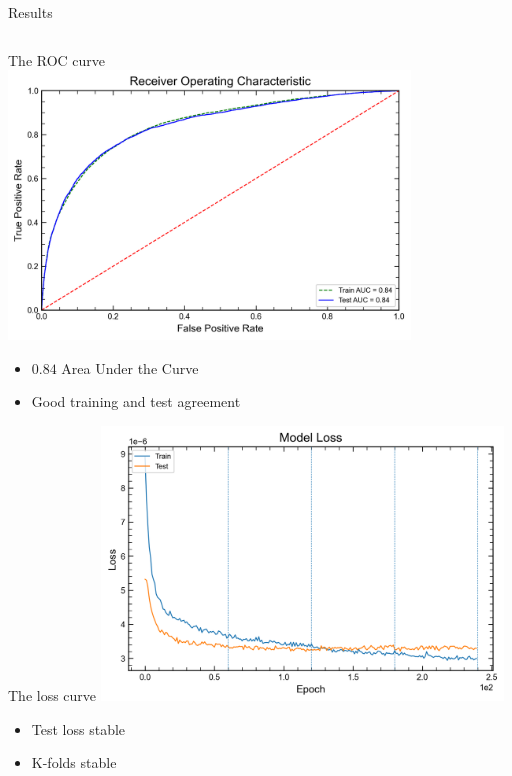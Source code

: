 \begin{frame}{Results}
\begin{columns}
\begin{column}{0.5\textwidth}
        \end{column}
    \end{columns}    
\end{frame}



\begin{frame}{The ROC curve}
  \centering \includegraphics[width=0.8\textwidth]{ROC_binary}
  \begin{itemize}
    \item $0.84$ Area Under the Curve
    \item Good training and test agreement
  \end{itemize}
\end{frame}

\begin{frame}{The loss curve}
  \centering \includegraphics[width=0.8\textwidth]{loss_binary}
\begin{itemize}
  \item Test loss stable
  \item K-folds stable
\end{itemize}
\end{frame}

